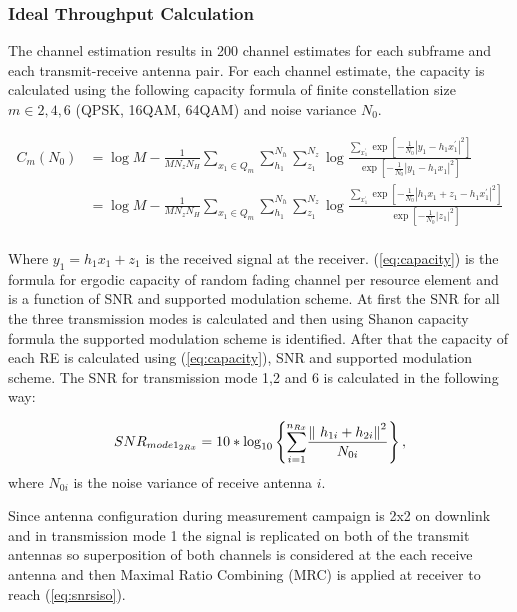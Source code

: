 \documentclass[a4paper,10pt]{article}
\begin{document}
\subsubsection{Ideal Throughput Calculation}
The channel estimation results in 200 channel estimates for each subframe and each transmit-receive antenna pair. For each channel estimate, the capacity is calculated using the following capacity formula of finite constellation size $m \in {2,4,6}$ (QPSK, 16QAM, 64QAM) and noise variance $N_0$.

\begin{align}
C_m\left(N_0\right)
&=\log M-\frac{1}{MN_{z}N_{H}}\sum_{x_{1}\in{Q_m}}\sum_{h_1}^{N_{h}}\sum_{z_{1}}^{N_{z}}\log\frac{\sum_{x^{'}_{1}}\exp\left[-\frac{1}{N_{0}}\left|y_{1}-h_{1}x^{'}_{1}\right|^2\right]}{\exp\left[-\frac{1}{N_{0}}\left|y_{1}-h_{1}x_{1}\right|^{2}\right]}\nonumber\\
&=\log M-\frac{1}{MN_{z}N_{H}}\sum_{x_{1}\in{Q_m}}\sum_{h_1}^{N_{h}}\sum_{z_{1}}^{N_{z}}\log\frac{\sum_{x^{'}_{1}}\exp\left[-\frac{1}{N_{0}}\left|h_{1}x_{1} + z_1 - h_1x^{'}_{1}\right|^2\right]}{\exp\left[-\frac{1}{N_{0}}\left|z_{1}\right|^{2}\right]}\nonumber\\
\label{eq:capacity}
\end{align}

Where $y_1 = h_1x_1 + z_1$ is the received signal at the receiver. (\ref{eq:capacity}) is the formula for ergodic capacity of random fading channel per resource element and is a function of SNR and supported modulation scheme. At first the SNR for all the three transmission modes is calculated and then using Shanon capacity formula the supported modulation scheme is identified. After that the capacity of each RE is calculated using (\ref{eq:capacity}), SNR and supported modulation scheme. The SNR for transmission mode 1,2 and 6 is calculated in the following way:

\begin{equation} \label{eq:snrsiso}
SNR_{mode1_{2Rx}} = 10*{\mathrm{log}}_{10} \left\lbrace {\sum_{i=1}^{n_{Rx}}} {\frac{{\| \ {h_{1i}} + {h_{2i}} \| \\}^2}{N_{0i}}}\right\rbrace,
\end{equation}
where $N_{0i}$ is the noise variance of receive antenna $i$.

Since antenna configuration during measurement campaign is 2x2 on downlink and in transmission mode 1 the signal is replicated on both of the transmit antennas so superposition of both channels is considered at the each receive antenna and then Maximal Ratio Combining (MRC) is applied at receiver to reach (\ref{eq:snrsiso}). 
 
\end{document}
